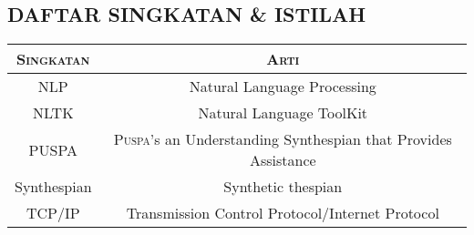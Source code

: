 \subsection*{\textcolor{subsectioncolor}{\textsf{DAFTAR SINGKATAN \& ISTILAH}}}

\begin{tabular}{|c|c|}
\hline
{\scshape Singkatan} & {\scshape Arti}\\
\hline
NLP & Natural Language Processing\\
\hline
NLTK & Natural Language ToolKit\\
\hline
PUSPA & {\scshape Puspa}'s an Understanding Synthespian that Provides Assistance\\
\hline
Synthespian & Synthetic thespian\\
\hline
TCP/IP & Transmission Control Protocol/Internet Protocol\\
\hline
\end{tabular}
